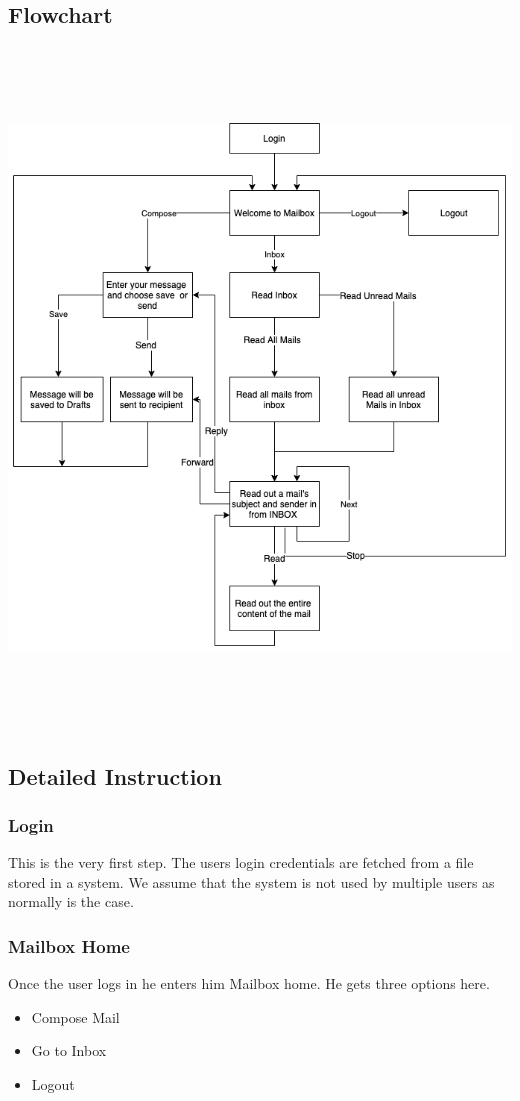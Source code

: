 \documentclass[12pt]{article}
\begin{document}
\subsection{Flowchart}
\includegraphics[height=18cm,width=16cm]{Flowchart.png}
\pagebreak
\subsection{Detailed Instruction}
\subsubsection{Login}
This is the very first step. The users login credentials are fetched from a file stored in a system. We assume that the system is not used by multiple users as normally is the case.
\subsubsection{Mailbox Home}
Once the user logs in he enters him Mailbox home. He gets three options here. \begin{itemize}
    \item Compose Mail
    \item Go to Inbox
    \item Logout
\end{itemize}
\end{document}
